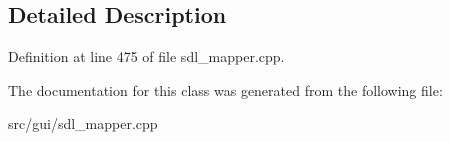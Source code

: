 \subsection{Detailed Description}


Definition at line 475 of file sdl\-\_\-mapper.\-cpp.



The documentation for this class was generated from the following file\-:\begin{DoxyCompactItemize}
\item 
src/gui/sdl\-\_\-mapper.\-cpp\end{DoxyCompactItemize}
